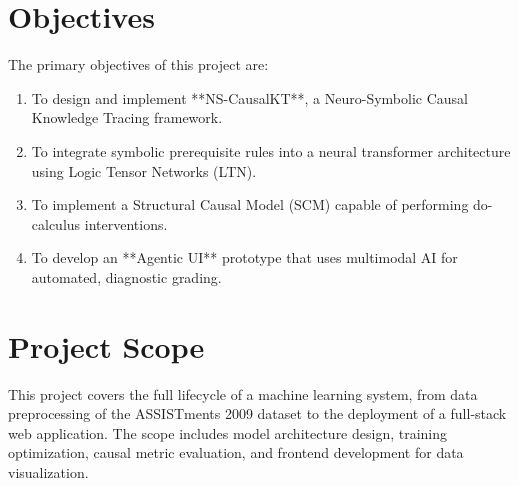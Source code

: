 \section{Objectives}
The primary objectives of this project are:
\begin{enumerate}
    \item To design and implement **NS-CausalKT**, a Neuro-Symbolic Causal Knowledge Tracing framework.
    \item To integrate symbolic prerequisite rules into a neural transformer architecture using Logic Tensor Networks (LTN).
    \item To implement a Structural Causal Model (SCM) capable of performing do-calculus interventions.
    \item To develop an **Agentic UI** prototype that uses multimodal AI for automated, diagnostic grading.
\end{enumerate}

\section{Project Scope}
This project covers the full lifecycle of a machine learning system, from data preprocessing of the ASSISTments 2009 dataset to the deployment of a full-stack web application. The scope includes model architecture design, training optimization, causal metric evaluation, and frontend development for data visualization.
